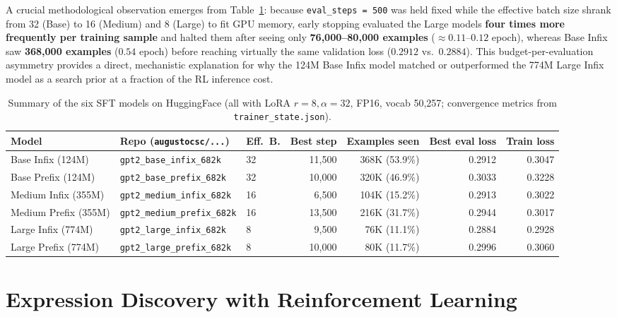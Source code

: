 A crucial methodological observation emerges from Table~\ref{tab:models_trained}: because \texttt{eval\_steps = 500} was held fixed while the effective batch size shrank from 32 (Base) to 16 (Medium) and 8 (Large) to fit GPU memory, early stopping evaluated the Large models \textbf{four times more frequently per training sample} and halted them after seeing only \textbf{76{,}000--80{,}000 examples} ($\approx 0.11$--$0.12$ epoch), whereas Base Infix saw \textbf{368{,}000 examples} ($0.54$ epoch) before reaching virtually the same validation loss ($0.2912$ vs.\ $0.2884$). This budget-per-evaluation asymmetry provides a direct, mechanistic explanation for why the 124M Base Infix model matched or outperformed the 774M Large Infix model as a search prior at a fraction of the RL inference cost.

\begin{table}[htbp]
    \centering
    \caption{Summary of the six SFT models on HuggingFace (all with LoRA $r=8, \alpha=32$, FP16, vocab 50{,}257; convergence metrics from \texttt{trainer\_state.json}).}
    \label{tab:models_trained}
    \small
    \begin{tabular}{lllrrrr}
    \toprule
    \textbf{Model} & \textbf{Repo (\texttt{augustocsc/...})} & \textbf{Eff.\ B.} & \textbf{Best step} & \textbf{Examples seen} & \textbf{Best eval loss} & \textbf{Train loss} \\
    \midrule
    Base Infix (124M)   & \texttt{gpt2\_base\_infix\_682k}   & 32 & 11{,}500 & 368K (53.9\%) & 0.2912 & 0.3047 \\
    Base Prefix (124M)  & \texttt{gpt2\_base\_prefix\_682k}  & 32 & 10{,}000 & 320K (46.9\%) & 0.3033 & 0.3228 \\
    Medium Infix (355M) & \texttt{gpt2\_medium\_infix\_682k} & 16 &  6{,}500 & 104K (15.2\%) & 0.2913 & 0.3022 \\
    Medium Prefix (355M)& \texttt{gpt2\_medium\_prefix\_682k}& 16 & 13{,}500 & 216K (31.7\%) & 0.2944 & 0.3017 \\
    Large Infix (774M)  & \texttt{gpt2\_large\_infix\_682k}  &  8 &  9{,}500 &  76K (11.1\%) & 0.2884 & 0.2928 \\
    Large Prefix (774M) & \texttt{gpt2\_large\_prefix\_682k} &  8 & 10{,}000 &  80K (11.7\%) & 0.2996 & 0.3060 \\
    \bottomrule
    \end{tabular}
\end{table}

\section{Expression Discovery with Reinforcement Learning}
\label{sec:expression_discovery}

